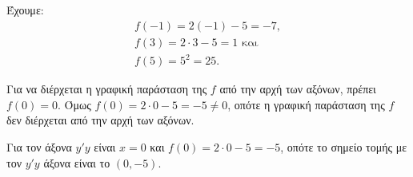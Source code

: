 
\begin{alist}
\item Έχουμε: 
\begin{gather*}
f(-1) = 2(-1) - 5 = -7, \\
f(3) = 2 \cdot 3 - 5 = 1\text{ και} \\
f(5) = 5^2 = 25.
\end{gather*}

\item Για να διέρχεται η γραφική παράσταση της $f$ από την αρχή των αξόνων, πρέπει $f(0) = 0$.
Όμως $f(0) = 2 \cdot 0 - 5 = -5 \ne 0$, οπότε η γραφική παράσταση της $f$ δεν διέρχεται από την αρχή
των αξόνων.

\item Για τον άξονα $y'y$ είναι $x = 0$ και $f(0) = 2 \cdot 0 - 5 = -5$, οπότε το σημείο τομής με τον $y'y$ 
άξονα είναι το $(0, -5)$.
\end{alist}

